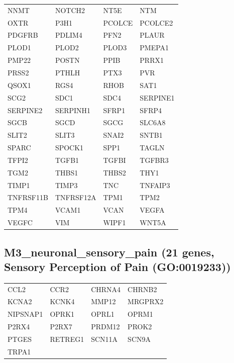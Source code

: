 \begin{longtable}{llll}
NNMT & NOTCH2 & NT5E & NTM \\
OXTR & P3H1 & PCOLCE & PCOLCE2 \\
PDGFRB & PDLIM4 & PFN2 & PLAUR \\
PLOD1 & PLOD2 & PLOD3 & PMEPA1 \\
PMP22 & POSTN & PPIB & PRRX1 \\
PRSS2 & PTHLH & PTX3 & PVR \\
QSOX1 & RGS4 & RHOB & SAT1 \\
SCG2 & SDC1 & SDC4 & SERPINE1 \\
SERPINE2 & SERPINH1 & SFRP1 & SFRP4 \\
SGCB & SGCD & SGCG & SLC6A8 \\
SLIT2 & SLIT3 & SNAI2 & SNTB1 \\
SPARC & SPOCK1 & SPP1 & TAGLN \\
TFPI2 & TGFB1 & TGFBI & TGFBR3 \\
TGM2 & THBS1 & THBS2 & THY1 \\
TIMP1 & TIMP3 & TNC & TNFAIP3 \\
TNFRSF11B & TNFRSF12A & TPM1 & TPM2 \\
TPM4 & VCAM1 & VCAN & VEGFA \\
VEGFC & VIM & WIPF1 & WNT5A \\
\end{longtable}
\subsection*{M3\_neuronal\_sensory\_pain (21 genes, Sensory Perception of Pain (GO:0019233))}
\begin{longtable}{llll}
CCL2 & CCR2 & CHRNA4 & CHRNB2 \\
KCNA2 & KCNK4 & MMP12 & MRGPRX2 \\
NIPSNAP1 & OPRK1 & OPRL1 & OPRM1 \\
P2RX4 & P2RX7 & PRDM12 & PROK2 \\
PTGES & RETREG1 & SCN11A & SCN9A \\
TRPA1 &  &  &  \\
\end{longtable}
